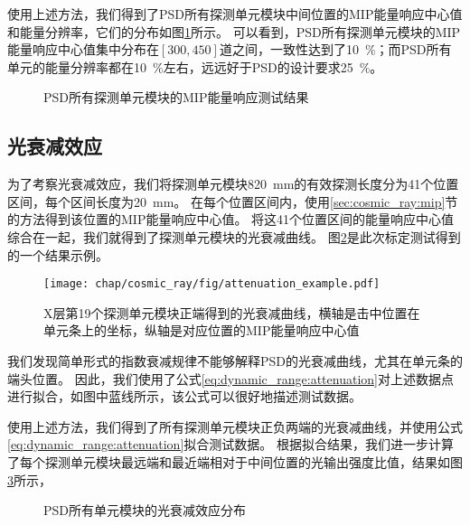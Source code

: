 使用上述方法，我们得到了PSD所有探测单元模块中间位置的MIP能量响应中心值和能量分辨率，它们的分布如图\ref{fig:cosmic_ray:mip_results}所示。
可以看到，PSD所有探测单元模块的MIP能量响应中心值集中分布在$[300,450]$道之间，一致性达到了\SI{10}{\percent}；而PSD所有单元的能量分辨率都在\SI{10}{\percent}左右，远远好于PSD的设计要求\SI{25}{\percent}。
\begin{figure}[htb]
\centering
{}
\caption{PSD所有探测单元模块的MIP能量响应测试结果}
\label{fig:cosmic_ray:mip_results}
\end{figure}

\subsection{光衰减效应}
\label{sec:cosmic_ray:attenuation}
为了考察光衰减效应，我们将探测单元模块\SI{820}{mm}的有效探测长度分为41个位置区间，每个区间长度为\SI{20}{mm}。
在每个位置区间内，使用\ref{sec:cosmic_ray:mip}节的方法得到该位置的MIP能量响应中心值。
将这41个位置区间的能量响应中心值综合在一起，我们就得到了探测单元模块的光衰减曲线。
图\ref{fig:cosmic_ray:attenuation_example}是此次标定测试得到的一个结果示例。
\begin{figure}[htbp]
	\centering
	\texttt{[image: chap/cosmic\_ray/fig/attenuation\_example.pdf]}
	\caption{X层第19个探测单元模块正端得到的光衰减曲线，横轴是击中位置在单元条上的坐标，纵轴是对应位置的MIP能量响应中心值}
	\label{fig:cosmic_ray:attenuation_example}
\end{figure}
我们发现简单形式的指数衰减规律不能够解释PSD的光衰减曲线，尤其在单元条的端头位置。
因此，我们使用了公式\ref{eq:dynamic_range:attenuation}对上述数据点进行拟合，如图中蓝线所示，该公式可以很好地描述测试数据。

使用上述方法，我们得到了所有探测单元模块正负两端的光衰减曲线，并使用公式\ref{eq:dynamic_range:attenuation}拟合测试数据。
根据拟合结果，我们进一步计算了每个探测单元模块最远端和最近端相对于中间位置的光输出强度比值，结果如图\ref{fig:cosmic_ray:atten_dist}所示，
\begin{figure}[htb]
\centering
{}
\caption{PSD所有单元模块的光衰减效应分布}
\label{fig:cosmic_ray:atten_dist}
\end{figure}

